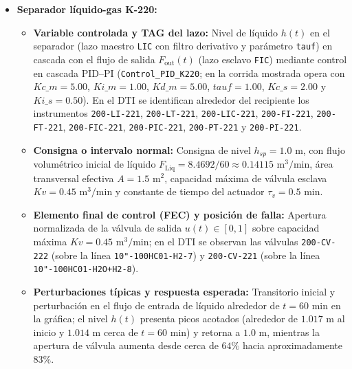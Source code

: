 \documentclass[11pt,letterpaper]{article}
\begin{document}
\begin{itemize}
    \item \textbf{Separador líquido-gas K-220:}
\begin{itemize}
    \item \textbf{Variable controlada y TAG del lazo:} Nivel de líquido $h(t)$ en el separador (lazo maestro \texttt{LIC} con filtro derivativo y parámetro \texttt{tauf}) en cascada con el flujo de salida $F_{\text{out}}(t)$ (lazo esclavo \texttt{FIC}) mediante control en cascada PID--PI (\texttt{Control\_PID\_K220}; en la corrida mostrada opera con $Kc\_m = 5.00$, $Ki\_m = 1.00$, $Kd\_m = 5.00$, $tauf = 1.00$, $Kc\_s = 2.00$ y $Ki\_s = 0.50$). En el DTI se identifican alrededor del recipiente los instrumentos \texttt{200-LI-221}, \texttt{200-LT-221}, \texttt{200-LIC-221}, \texttt{200-FI-221}, \texttt{200-FT-221}, \texttt{200-FIC-221}, \texttt{200-PIC-221}, \texttt{200-PT-221} y \texttt{200-PI-221}.
    \item \textbf{Consigna o intervalo normal:} Consigna de nivel $h_{sp} = 1.0\text{ m}$, con flujo volumétrico inicial de líquido $F_{\text{Liq}} = 8.4692/60 \approx 0.14115\text{ m}^3/\text{min}$, área transversal efectiva $A = 1.5\text{ m}^2$, capacidad máxima de válvula esclava $Kv = 0.45\text{ m}^3/\text{min}$ y constante de tiempo del actuador $\tau_v = 0.5\text{ min}$.
    \item \textbf{Elemento final de control (FEC) y posición de falla:} Apertura normalizada de la válvula de salida $u(t) \in [0, 1]$ sobre capacidad máxima $Kv = 0.45\text{ m}^3/\text{min}$; en el DTI se observan las válvulas \texttt{200-CV-222} (sobre la línea \texttt{10"-100HC01-H2-7}) y \texttt{200-CV-221} (sobre la línea \texttt{10"-100HC01-H2O+H2-8}).
    \item \textbf{Perturbaciones típicas y respuesta esperada:} Transitorio inicial y perturbación en el flujo de entrada de líquido alrededor de $t = 60\text{ min}$ en la gráfica; el nivel $h(t)$ presenta picos acotados (alrededor de $1.017\text{ m}$ al inicio y $1.014\text{ m}$ cerca de $t = 60\text{ min}$) y retorna a $1.0\text{ m}$, mientras la apertura de válvula aumenta desde cerca de $64\%$ hacia aproximadamente $83\%$.
\end{itemize}


\end{itemize}
\end{document}
